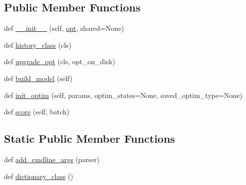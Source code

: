 \subsection*{Public Member Functions}
\begin{DoxyCompactItemize}
\item 
def \hyperlink{classparlai_1_1agents_1_1bert__classifier_1_1bert__classifier_1_1BertClassifierAgent_ac05f1d52c400de5b60284121b4a49746}{\+\_\+\+\_\+init\+\_\+\+\_\+} (self, \hyperlink{classparlai_1_1core_1_1torch__agent_1_1TorchAgent_a785bb920cf8c8afc3e9bf6a8b77e335a}{opt}, shared=None)
\item 
def \hyperlink{classparlai_1_1agents_1_1bert__classifier_1_1bert__classifier_1_1BertClassifierAgent_ad606525729dd0340fc98a0bb50e24187}{history\+\_\+class} (cls)
\item 
def \hyperlink{classparlai_1_1agents_1_1bert__classifier_1_1bert__classifier_1_1BertClassifierAgent_a2eabac94b73fb53be7e7b05ccc788621}{upgrade\+\_\+opt} (cls, opt\+\_\+on\+\_\+disk)
\item 
def \hyperlink{classparlai_1_1agents_1_1bert__classifier_1_1bert__classifier_1_1BertClassifierAgent_a9bd6daeddde03212d67e452ef93118c4}{build\+\_\+model} (self)
\item 
def \hyperlink{classparlai_1_1agents_1_1bert__classifier_1_1bert__classifier_1_1BertClassifierAgent_aaf78ab1d312861ef4ba73bc7813e68aa}{init\+\_\+optim} (self, params, optim\+\_\+states=None, saved\+\_\+optim\+\_\+type=None)
\item 
def \hyperlink{classparlai_1_1agents_1_1bert__classifier_1_1bert__classifier_1_1BertClassifierAgent_a2fa163d78b44698fa35a491e9a7a6207}{score} (self, batch)
\end{DoxyCompactItemize}
\subsection*{Static Public Member Functions}
\begin{DoxyCompactItemize}
\item 
def \hyperlink{classparlai_1_1agents_1_1bert__classifier_1_1bert__classifier_1_1BertClassifierAgent_a461c2531f3428f00804184df95dd6070}{add\+\_\+cmdline\+\_\+args} (parser)
\item 
def \hyperlink{classparlai_1_1agents_1_1bert__classifier_1_1bert__classifier_1_1BertClassifierAgent_af568b5ebe0ada0e2823e9e2be2d70e9f}{dictionary\+\_\+class} ()
\end{DoxyCompactItemize}
